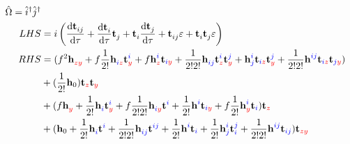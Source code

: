 \documentclass{article}
\newcommand{\bh}{\textbf{h}}
\newcommand{\bt}{\textbf{t}}
\newcommand{\up}[1]{\hat{#1}^{\dagger}}
\begin{document}
%
%
%
%
%

\begin{align}\begin{split}
    \hat{\Omega} = \up{i}\up{j}
\\ LHS &=
    i\left(\dv{\bt^{}_{ij}}{\tau} + \dv{\bt^{}_{i}}{\tau}\bt^{}_{j} + \bt^{}_{i}\dv{\bt^{}_{j}}{\tau} + \bt^{}_{ij}\varepsilon + \bt^{}_{i}\bt^{}_{j}\varepsilon\right)
\\ RHS &=
%
%
(f^{2}\bh^{\blue{}\red{}}_{\blue{}\red{zy}} + f\frac{1}{2!}\bh^{\blue{}\red{}}_{\blue{i}\red{z}}\bt^{\blue{i}\red{}}_{\blue{}\red{y}} + f\bh^{\blue{i}\red{}}_{\blue{}\red{z}}\bt_{\blue{i}\red{y}} + \frac{1}{2!2!}\bh^{\blue{}\red{}}_{\blue{ij}\red{}}\bt^{\blue{i}\red{}}_{\blue{}\red{z}}\bt^{\blue{j}\red{}}_{\blue{}\red{y}} + \bh^{\blue{i}\red{}}_{\blue{j}\red{}}\bt_{\blue{i}\red{z}}\bt^{\blue{j}\red{}}_{\blue{}\red{y}} + \frac{1}{2!2!}\bh^{\blue{ij}\red{}}_{\blue{}\red{}}\bt_{\blue{i}\red{z}}\bt_{\blue{j}\red{y}})
%
%
\\  &+
%
%
(\frac{1}{2!}\bh_0)\bt_{\blue{}\red{z}}\bt_{\blue{}\red{y}}
    \\  &+  %
(f\bh^{\blue{}\red{}}_{\blue{}\red{y}} + \frac{1}{2!}\bh^{\blue{}\red{}}_{\blue{i}\red{}}\bt^{\blue{i}\red{}}_{\blue{}\red{y}} + f\frac{1}{2!2!}\bh^{\blue{}\red{}}_{\blue{i}\red{y}}\bt^{\blue{i}\red{}} + \frac{1}{2!}\bh^{\blue{i}\red{}}_{\blue{}\red{}}\bt_{\blue{i}\red{y}} + f\frac{1}{2!}\bh^{\blue{i}\red{}}_{\blue{}\red{y}}\bt_{\blue{i}\red{}})\bt_{\blue{}\red{z}}
%
%
\\  &+
%
%
(\bh_0 + \frac{1}{2!}\bh^{\blue{}\red{}}_{\blue{i}\red{}}\bt^{\blue{i}\red{}} + \frac{1}{2!2!}\bh^{\blue{}\red{}}_{\blue{ij}\red{}}\bt^{\blue{ij}\red{}} + \frac{1}{2!}\bh^{\blue{i}\red{}}_{\blue{}\red{}}\bt_{\blue{i}\red{}} + \frac{1}{2!}\bh^{\blue{i}\red{}}_{\blue{j}\red{}}\bt^{\blue{j}\red{}}_{\blue{i}\red{}} + \frac{1}{2!2!}\bh^{\blue{ij}\red{}}_{\blue{}\red{}}\bt_{\blue{ij}\red{}})\bt_{\blue{}\red{zy}}
\end{split}\end{align}
\end{document}
